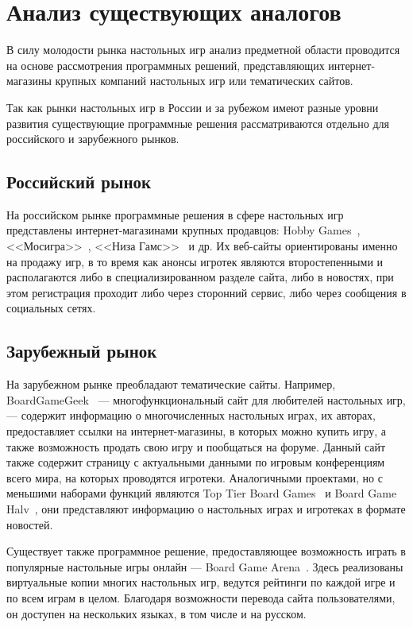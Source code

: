 \section{Анализ существующих аналогов}

В силу молодости рынка настольных игр анализ предметной области проводится на
основе рассмотрения программных решений, представляющих интернет-магазины
крупных компаний настольных игр или тематических сайтов.

Так как рынки настольных игр в России и за рубежом имеют разные уровни развития
существующие программные решения рассматриваются отдельно для российского и
зарубежного рынков.

\subsection{Российский рынок}

На российском рынке программные решения в сфере настольных игр представлены
интернет-магазинами крупных продавцов: Hobby Games~\cite{site01},
<<Мосигра>>~\cite{site02}, <<Низа Гамс>>~\cite{site03} и др. Их веб-сайты
ориентированы именно на продажу игр, в то время как анонсы игротек являются
второстепенными и располагаются либо в специализированном разделе сайта, либо в
новостях, при этом регистрация проходит либо через сторонний сервис, либо через
сообщения в социальных сетях.

\subsection{Зарубежный рынок}

На зарубежном рынке преобладают тематические сайты. Например,
BoardGameGeek~\cite{site04} --- многофункциональный сайт для любителей
настольных игр, --- содержит информацию о многочисленных настольных играх, их
авторах, предоставляет ссылки на интернет-магазины, в которых можно купить игру,
а также возможность продать свою игру и пообщаться на форуме. Данный сайт также
содержит страницу с актуальными данными по игровым конференциям всего мира, на
которых проводятся игротеки. Аналогичными проектами, но с меньшими наборами
функций являются Top Tier Board Games~\cite{site05} и Board Game
Halv~\cite{site06}, они представляют информацию о настольных играх и игротеках в
формате новостей.

Существует также программное решение, предоставляющее возможность играть в
популярные настольные игры онлайн --- Board Game Arena~\cite{site07}. Здесь
реализованы виртуальные копии многих настольных игр, ведутся рейтинги по каждой
игре и по всем играм в целом. Благодаря возможности перевода сайта
пользователями, он доступен на нескольких языках, в том числе и на русском.


